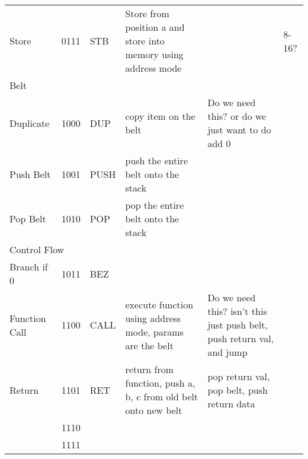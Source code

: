 \documentclass{article}
\begin{document}
\begin{tabular}{llllll}
    Store         & 0111   & STB      & Store from position a and store into memory using address mode          &                                                                       & 8-16?           \\
    \multicolumn{5}{l}{Belt}                                                                                                                                                            &                 \\
    Duplicate     & 1000   & DUP      & copy item on the belt                                                   & Do we need this? or do we just want to do add 0                       &                 \\
    Push Belt     & 1001   & PUSH     & push the entire belt onto the stack                                     &                                                                       &                 \\
    Pop Belt      & 1010   & POP      & pop the entire belt onto the stack                                      &                                                                       &                 \\
    \multicolumn{5}{l}{Control Flow}                                                                                                                                                    &                 \\
    Branch if 0   & 1011   & BEZ      &                                                                         &                                                                       &                 \\
    Function Call & 1100   & CALL     & execute function using address mode, params are the belt                & Do we need this? isn't this just push belt, push return val, and jump &                 \\
    Return        & 1101   & RET      & return from function, push a, b, c from old belt onto new belt          & pop return val, pop belt, push return data                            &                 \\
                  & 1110   &          &                                                                         &                                                                       &                 \\
                  & 1111   &          &                                                                         &                                                                       &                
    \end{tabular}
\end{document}
